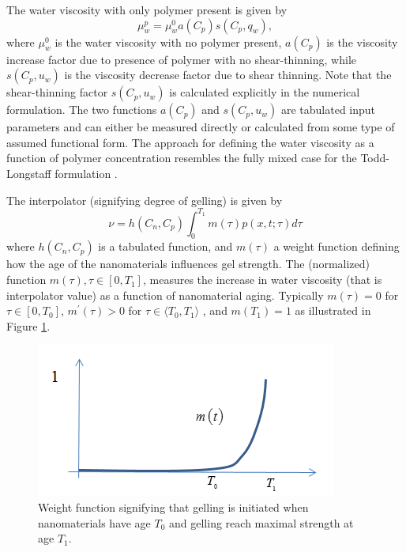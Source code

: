\documentclass[nanomaterials,article,submit,moreauthors,pdftex]{Definitions/mdpi}
\begin{document}
The water viscosity with only polymer present is given by
\begin{equation}
    \mu_w^p=\mu_w^0 a(C_p) s(C_p, q_w),
\end{equation}
where $\mu_w^0$ is the water viscosity with no polymer present, $a (C_p)$ is the viscosity increase factor due to presence of polymer with no shear-thinning, while $s(C_p, u_w)$ is the viscosity decrease factor due to shear thinning. Note that the shear-thinning factor $s(C_p, u_w)$ is calculated explicitly in the numerical formulation. The two functions $a (C_p)$ and $s(C_p, u_w)$ are tabulated input parameters and can either be measured directly or calculated from some type of assumed functional form. The approach for defining the water viscosity as a function of polymer concentration resembles the fully mixed case for the Todd-Longstaff formulation \citep{slb2015}.   

The interpolator (signifying degree of gelling) is given by
\begin{equation} \label{eq:ageEffect} %
    \nu=h(C_n,C_p) \int^{T_1}_{0}m(\tau)p(x,t;\tau)d\tau
\end{equation}
where $h(C_n,C_p)$ is a tabulated function, and $m(\tau)$ a weight function defining how the age of the nanomaterials influences gel strength. The (normalized) function $m(\tau), \tau\in[0,T_1]$, measures the increase in water viscosity (that is interpolator value) as a function of nanomaterial aging. Typically $m(\tau)=0$ for $\tau\in[0,T_0]$,  $m^\prime(\tau)>0$ for $\tau\in\langle T_0, T_1\rangle$ , and $m(T_1)=1$ as illustrated in Figure \ref{fig:weightFunc}.

\begin{figure}[h]
    \centering
    \includegraphics[width=.5\textwidth]{fig/weightFunc.png}
    \caption{Weight function signifying that gelling is initiated when nanomaterials have age $T_0$ and gelling reach maximal strength at age $T_1$.}
    \label{fig:weightFunc}
\end{figure}
\end{document}
